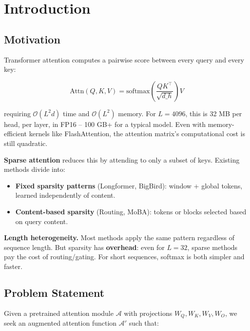 \section{Introduction}

\subsection{Motivation}

Transformer attention computes a pairwise score between every query and 
every key:

\[
\text{Attn}(Q, K, V) = \text{softmax}\!\left(\frac{Q K^\top}{\sqrt{d\_h}}\right) V
\tag{1.1}
\]

requiring $\mathcal{O}(L^2 d)$ time and $\mathcal{O}(L^2)$ memory. For 
$L = 4096$, this is 32 MB per head, per layer, in FP16 -- 100 GB+ for a 
typical model. Even with memory-efficient kernels like FlashAttention, the 
attention matrix's computational cost is still quadratic.

\textbf{Sparse attention} reduces this by attending to only a subset of keys. 
Existing methods divide into:

\begin{itemize}
\item \textbf{Fixed sparsity patterns} (Longformer, BigBird): window + global tokens,
  learned independently of content.
\item \textbf{Content-based sparsity} (Routing, MoBA): tokens or blocks selected
  based on query content.

\end{itemize}
\textbf{Length heterogeneity.} Most methods apply the same pattern regardless of 
sequence length. But sparsity has \textbf{overhead}: even for $L = 32$, sparse 
methods pay the cost of routing/gating. For short sequences, softmax is 
both simpler and faster.

\subsection{Problem Statement}

Given a pretrained attention module $\mathcal{A}$ with projections 
$W_Q, W_K, W_V, W_O$, we seek an augmented attention function 
$\mathcal{A}'$ such that:

